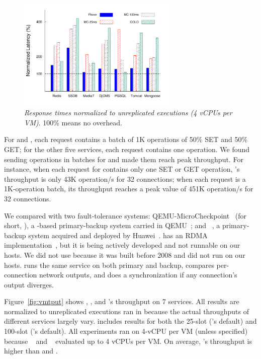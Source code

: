 \begin{figure}[htbp]
\centering
\includegraphics[width=3in]{figures/FIG9_latency-overhead}
\caption{{\em Response times normalized to unreplicated 
executions (4 vCPUs per VM)}. 100\% means no overhead.}
\label{fig:latency}
\end{figure}

For \redis and \ssdb, each request contains a batch of 1K operations 
of 50\% SET and 50\% GET; for the other five services, each request contains 
one operation. We found sending operations in batches for \redis and \ssdb made 
them reach peak throughput. For instance, when each request for \redis contains 
only one SET or GET operation, \redis's throughput is only 43K operation/s for 
32 connections; when each request is a 1K-operation batch, its throughput 
reaches a peak value of 451K operation/s for 32 connections.

We compared \yyy with two fault-tolerance systems:
QEMU-MicroCheckpoint~\cite{qemu-mc} (for short, \qemumc),  a \remus-based 
primary-backup system carried in QEMU~\cite{qemu}; and 
\colo~\cite{dong2013colo}, a primary-backup system acquired and deployed by 
Huawei~\cite{fusionsphere}. \qemumc has an RDMA 
implementation~\cite{qemu-mc-rdma}, but it is being actively developed and 
not runnable on our hosts. We did not use \remus because 
it was built before 2008 and did not run on our hosts. \colo runs the same 
service on both primary and backup, compares per-connection network outputs, 
and does a synchronization if any connection's output diverges.

Figure~\ref{fig:vmtput} shows \yyy, \qemumc, and \colo's throughput on 
7 services. All results are normalized to unreplicated executions ran 
in \kvm because the actual throughputs of different services largely vary. 
\qemumc includes results for both the 25\ms-slot (\remus's default) and 
100\ms-slot (\qemumc's default).
All experiments ran on 4-vCPU per VM (unless specified) because 
\colo~\cite{dong2013colo} and \remus~\cite{remus:nsdi08} evaluated up to 4 
vCPUs per VM. On average, \yyy's throughput is \avgtput higher than \qemumc and 
\colo.

